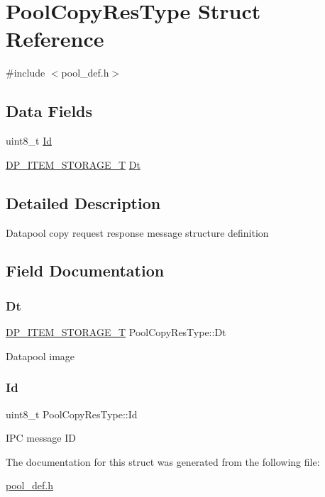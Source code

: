 \hypertarget{structPoolCopyResType}{}\section{Pool\+Copy\+Res\+Type Struct Reference}
\label{structPoolCopyResType}


{\ttfamily \#include $<$pool\+\_\+def.\+h$>$}

\subsection*{Data Fields}
\begin{DoxyCompactItemize}
\item 
uint8\+\_\+t \mbox{\hyperlink{structPoolCopyResType_a033539dd57829dd1116f8663ea83d3a5}{Id}}
\item 
\mbox{\hyperlink{structDP__ITEM__STORAGE__T}{D\+P\+\_\+\+I\+T\+E\+M\+\_\+\+S\+T\+O\+R\+A\+G\+E\+\_\+T}} \mbox{\hyperlink{structPoolCopyResType_a379c03ee4a5c9ddaf9d048ad922d3378}{Dt}}
\end{DoxyCompactItemize}


\subsection{Detailed Description}
Datapool copy request response message structure definition 

\subsection{Field Documentation}
\mbox{\label{structPoolCopyResType_a379c03ee4a5c9ddaf9d048ad922d3378}} 
\subsubsection{\texorpdfstring{Dt}{Dt}}
{\footnotesize\ttfamily \mbox{\hyperlink{structDP__ITEM__STORAGE__T}{D\+P\+\_\+\+I\+T\+E\+M\+\_\+\+S\+T\+O\+R\+A\+G\+E\+\_\+T}} Pool\+Copy\+Res\+Type\+::\+Dt}

Datapool image \mbox{\label{structPoolCopyResType_a033539dd57829dd1116f8663ea83d3a5}} 
\subsubsection{\texorpdfstring{Id}{Id}}
{\footnotesize\ttfamily uint8\+\_\+t Pool\+Copy\+Res\+Type\+::\+Id}

I\+PC message ID 

The documentation for this struct was generated from the following file\+:\begin{DoxyCompactItemize}
\item 
\mbox{\hyperlink{pool__def_8h}{pool\+\_\+def.\+h}}\end{DoxyCompactItemize}
